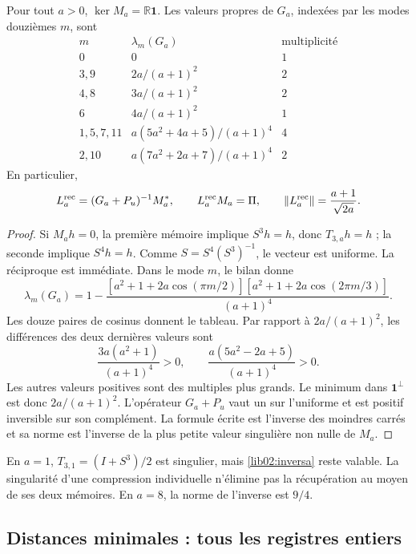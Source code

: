 \begin{theorem}
\label{lib02:inversa-memorias}
Pour tout \(a>0\), \(\ker M_a=\mathbb R\mathbf1\). Les valeurs propres de \(G_a\), indexées par les modes douzièmes \(m\), sont
\[
\begin{array}{c|c|c}
 m&\lambda_m(G_a)&\text{multiplicité}\\\hline
 0&0&1\\
 3,9&2a/(a+1)^2&2\\
 4,8&3a/(a+1)^2&2\\
 6&4a/(a+1)^2&1\\
 1,5,7,11&a(5a^2+4a+5)/(a+1)^4&4\\
 2,10&a(7a^2+2a+7)/(a+1)^4&2
\end{array}
\]
En particulier,
\begin{equation}
 L_a^{\rm rec}=(G_a+P_u)^{-1}M_a^*,\qquad
 L_a^{\rm rec}M_a=\Pi,\qquad
 \|L_a^{\rm rec}\|=\frac{a+1}{\sqrt{2a}}.
 \label{lib02:inversa}
\end{equation}
\end{theorem}
\begin{proof}
Si \(M_ah=0\), la première mémoire implique \(S^3h=h\), donc
\(T_{3,a}h=h\) ; la seconde implique \(S^4h=h\). Comme
\(S=S^4(S^3)^{-1}\), le vecteur est uniforme. La réciproque est
immédiate. Dans le mode \(m\), le bilan donne
\[
 \lambda_m(G_a)=1-
 \frac{[a^2+1+2a\cos(\pi m/2)]
 [a^2+1+2a\cos(2\pi m/3)]}{(a+1)^4}.
\]
Les douze paires de cosinus donnent le tableau. Par rapport à \(2a/(a+1)^2\), les différences des deux dernières valeurs sont
\[
 \frac{3a(a^2+1)}{(a+1)^4}>0,\qquad
 \frac{a(5a^2-2a+5)}{(a+1)^4}>0.
\]
Les autres valeurs positives sont des multiples plus grands. Le minimum
dans \(\mathbf1^\perp\) est donc \(2a/(a+1)^2\). L’opérateur
\(G_a+P_u\) vaut un sur l’uniforme et est positif inversible sur
son complément. La formule écrite est l’inverse des moindres carrés
et sa norme est l’inverse de la plus petite valeur singulière non nulle de \(M_a\).
\end{proof}

En \(a=1\), \(T_{3,1}=(I+S^3)/2\) est singulier, mais \eqref{lib02:inversa} reste valable. La singularité d'une compression individuelle n'élimine pas la récupération au moyen de ses deux mémoires. En \(a=8\), la norme de l'inverse est \(9/4\).

\subsection{Distances minimales : tous les registres entiers}
\label{lib02:redes}

